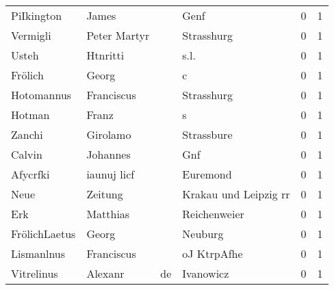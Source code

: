\begin{tabular}{llllrr}
               PiIkington &                              James &             &                                        Genf &          0 &         1 \\
                 Vermigli &                       Peter Martyr &             &                                  Strasshurg &          0 &         1 \\
                    Usteh &                           Htnritti &             &                                        s.l. &          0 &         1 \\
                  Frölich &                              Georg &             &                                           c &          0 &         1 \\
               Hotomannus &                         Franciscus &             &                                  Strasshurg &          0 &         1 \\
                   Hotman &                              Franz &             &                                           s &          0 &         1 \\
                   Zanchi &                           Girolamo &             &                                  Strassbure &          0 &         1 \\
                   Calvin &                           Johannes &             &                                         Gnf &          0 &         1 \\
                 Afycrfki &                        iaunuj licf &             &                                    Euremond &          0 &         1 \\
                     Neue &                            Zeitung &             &                       Krakau und Leipzig rr &          0 &         1 \\
                      Erk &                           Matthias &             &                                Reichenweier &          0 &         1 \\
            FrölichLaetus &                              Georg &             &                                     Neuburg &          0 &         1 \\
               Lismanlnus &                         Franciscus &             &                                 oJ KtrpAfhe &          0 &         1 \\
               Vitrelinus &                            Alexanr &          de &                                   Ivanowicz &          0 &         1 \\

\end{tabular}
